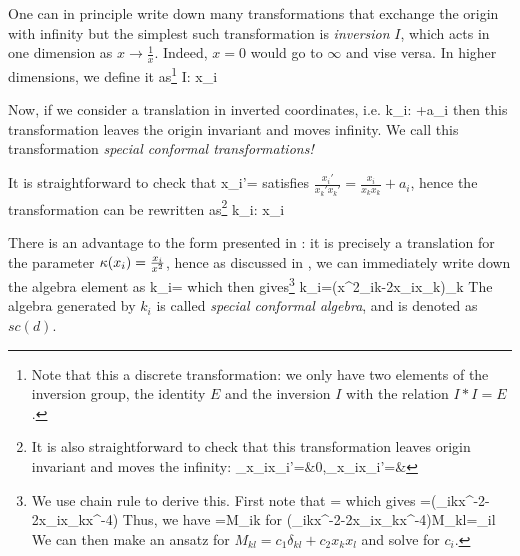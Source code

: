 One can in principle write down many transformations that exchange the origin with infinity but the simplest such transformation is \emph{inversion} $I$, which acts in one dimension as $x\rightarrow \frac{1}{x}$. Indeed, $x=0$ would go to $\infty$ and vise versa. In higher dimensions, we define it as\footnote{Note that this a discrete transformation: we only have two elements of the inversion group, the identity $E$ and the inversion $I$ with the relation $I*I=E$.}
\be 
I: x_i\rightarrow{}
\ee  

Now, if we consider a translation in inverted coordinates, i.e. 
\be 
\label{eq: special conformal transformation}
k_i: \rightarrow {}+a_i
\ee 
then this transformation leaves the origin invariant and moves infinity. We call this transformation \emph{special conformal transformations!}

It is straightforward to check that 
\be 
x_i'=
\ee 
satisfies $\frac{x_i'}{x_k'x_k'}= \frac{x_i}{x_kx_k}+a_i$, hence the transformation can be rewritten as\footnote{It is also straightforward to check that this transformation leaves origin invariant and moves the infinity:
	\be 
	\lim\limits_{x_i}x_i'=&0\;,\quad \lim\limits_{x_i\rightarrow\infty}x_i'=&
	\ee 
}
\be 
\label{eq: finite special conformal transformation}
k_i:  x_i\rightarrow{}
\ee 

There is an advantage to the form presented in : it is precisely a translation for the parameter $\kappa(x_i)=\frac{x_i}{x^2}$, hence as discussed in \secref{\ref{sec: translations, rotations, and dilations}}, we can immediately write down the algebra element as
\be 
k_i=
\ee 
which then gives\footnote{
	We use chain rule to derive this. First note that
	\be 
	=
	\ee 
	which gives
	\be 
	=\left(\delta_{ik}x^{-2}-2x_ix_kx^{-4}\right)
	\ee 
	Thus, we have
	\be 
	=M_{ik}
	\ee 
	for 
	\be 
	\left(\delta_{ik}x^{-2}-2x_ix_kx^{-4}\right)M_{kl}=\delta_{il}
	\ee
	We can then make an ansatz for $M_{kl}=c_1\delta_{kl}+c_2x_kx_l$ and solve for $c_i$.
}
\be 
k_i=\left(x^2\delta_{ik}-2x_ix_k\right)\partial_k
\ee 
The algebra generated by $k_i$ is called \emph{special conformal algebra}, and is denoted as $sc(d)$.

